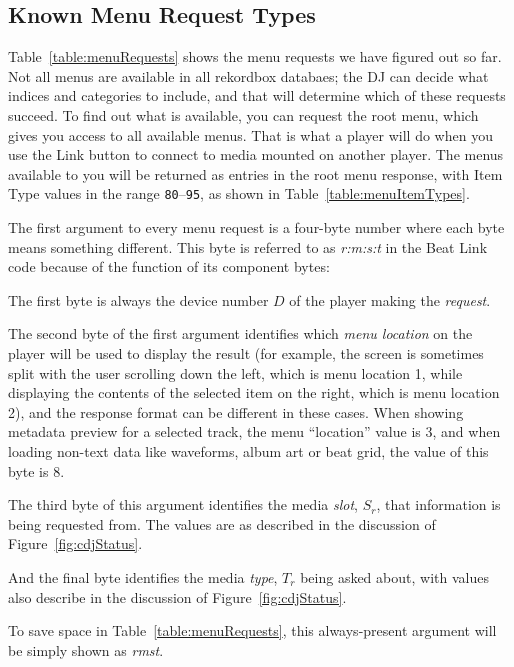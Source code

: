 \documentclass[11pt]{article}
\newcommand{\rmst}{{\it\small rmst}}
\begin{document}
\subsection{Known Menu Request Types}

Table~\ref{table:menuRequests} shows the menu requests we have figured
out so far. Not all menus are available in all rekordbox databaes; the
DJ can decide what indices and categories to include, and that will
determine which of these requests succeed. To find out what is
available, you can request the root menu, which gives you access to
all available menus. That is what a player will do when you use the
Link button to connect to media mounted on another player. The menus
available to you will be returned as entries in the root menu
response, with Item Type values in the range {\tt 80}--{\tt 95}, as
shown in Table~\ref{table:menuItemTypes}.

The first argument to every menu request is a four-byte number where
each byte means something different. This byte is referred to as
{\it r:m:s:t} in the Beat Link code because of the function of its
component bytes:

The first byte is always the device number $D$ of the player making
the {\it request}.

The second byte of the first argument identifies which {\it menu
  location} on the player will be used to display the result (for
example, the screen is sometimes split with the user scrolling down
the left, which is menu location 1, while displaying the contents of
the selected item on the right, which is menu location 2), and the
response format can be different in these cases. When showing metadata
preview for a selected track, the menu ``location'' value is 3, and
when loading non-text data like waveforms, album art or beat grid, the
value of this byte is 8.

The third byte of this argument identifies the media {\it slot},
$S_r$, that information is being requested from. The values are as
described in the discussion of Figure~\ref{fig:cdjStatus}.

And the final byte identifies the media {\it type}, $T_r$ being asked
about, with values also describe in the discussion of
Figure~\ref{fig:cdjStatus}.

To save space in Table~\ref{table:menuRequests}, this always-present
argument will be simply shown as \rmst.
\end{document}
